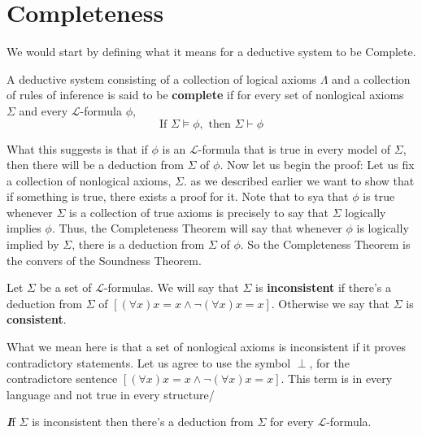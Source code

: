 \documentclass[9pt,a4paper, twocolumn]{article}
\newenvironment{callout}
	{\begin{calloutbox}\color{charcoal}\textbf\textit}
	{\end{calloutbox}}
\newcommand{\curveL}{\mathcal{L}}
\begin{document}
    \section*{Completeness}
        We would start by defining what it means for a deductive system to be Complete. 
        \begin{define}
            A deductive system consisting of a collection of logical axioms $\Lambda$ and a collection of rules of inference is said to be \textbf{complete} if for every set of nonlogical axioms $\Sigma$ and every $\curveL$-formula $\phi$, 
            \begin{equation}
                \text{If } \Sigma\vDash\phi, \text{ then } \Sigma\vdash\phi
            \end{equation}
        \end{define}
        What this suggests is that if $\phi$ is an $\curveL$-formula that is true in every model of $\Sigma$, then there will be a deduction from $\Sigma$ of $\phi$. Now let us begin the proof:
        Let us fix a collection of nonlogical axioms, $\Sigma$. as we described earlier we want to show that if something is true, there exists a proof for it. Note that to sya that $\phi$ is true whenever $\Sigma$ is a collection of true axioms is precisely to say that $\Sigma$ logically implies $\phi$. Thus, the Completeness Theorem will say that whenever $\phi$ is logically implied by $\Sigma$, there is a deduction from $\Sigma$ of $\phi$. So the Completeness Theorem is the convers of the Soundness Theorem. 
        \begin{define}
            Let $\Sigma$ be a set of $\curveL$-formulas. We will say that $\Sigma$ is \textbf{inconsistent} if there's a deduction from $\Sigma$ of $\left[(\forall x)x=x \land \neg(\forall x)x=x\right]$. Otherwise we say that $\Sigma$ is \textbf{consistent}.
        \end{define}
        What we mean here is that a set of nonlogical axioms is inconsistent if it proves contradictory statements. Let us agree to use the symbol $\perp$, for the contradictore sentence $\left[(\forall x)x=x \land \neg(\forall x)x=x\right]$. This term is in every language and not true in every structure/
        \begin{callout}
            If $\Sigma$ is inconsistent then there's a deduction from $\Sigma$ for every $\curveL$-formula.
        \end{callout}
\end{document}

